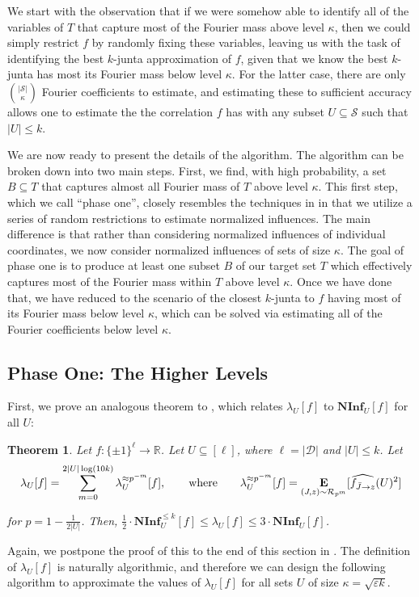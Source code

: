 \documentclass[10pt,a4paper]{article}
\theoremstyle{plain}
\newtheorem{theorem}{Theorem}[section]
\theoremstyle{remark}
\theoremstyle{plain}
\providecommand{\R}{}
\renewcommand{\R}{\mathbb{R}}
\providecommand{\E}{}
\renewcommand{\E}{\mathop{\bf E\/}}
\newcommand\NormInf{{\mathbf{NInf}}}
\newcommand{\eps}{\varepsilon}
\renewcommand{\hat}{\widehat}
\newcommand{\pmone}{\{\pm 1\}}
\newcommand{\calR}{\mathcal{R}}
\newcommand{\calS}{\mathcal{S}}
\newcommand{\InfluentialCoords}{\calS}
\newcommand{\InfluentialOracles}{\mathcal{D}}
\newcommand{\Restrictedf}{f_{\bar{J}\to z}}
\newcommand{\specialset}{T}
\newcommand{\fourierCutoff}{\kappa}
\begin{document}
We start with the observation that if we were somehow able to identify all of the variables of $\specialset$ that capture most of the Fourier mass above level $\fourierCutoff$, then we could simply restrict $f$ by randomly fixing these variables, leaving us with the task of identifying the best $k$-junta approximation of $f$, given that we know the best $k$-junta has most its Fourier mass below level $\fourierCutoff$. For the latter case, there are only $\binom{|\InfluentialCoords|}{\fourierCutoff}$ Fourier coefficients to estimate, and estimating these to sufficient accuracy allows one to estimate the the correlation $f$ has with any subset $U\subseteq \InfluentialCoords$ such that $|U| \leq k$. 


We are now ready to present the details of the algorithm. The algorithm can be  broken down into two main steps. First, we find, with high probability, a set $B \subseteq \specialset$ that captures almost all Fourier mass of $T$ above level $\fourierCutoff$. This first step, which we call ``phase one'', closely resembles the techniques in  in that we utilize a series of random restrictions to estimate normalized influences. The main difference is that rather than considering normalized influences of individual coordinates, we now consider normalized influences of sets of size $\fourierCutoff$. The goal of phase one is to produce at least one subset $B$ of our target set $\specialset$ which effectively captures most of the Fourier mass within $T$ above level $\fourierCutoff$. Once we have done that, we have reduced to the scenario of the closest $k$-junta to $f$ having most of its Fourier mass below level $\fourierCutoff$, which can be solved via estimating all of the Fourier coefficients below level $\fourierCutoff$. 

\subsection{Phase One: The Higher Levels}

First, we prove an analogous theorem to , which relates $\lambda_U[f]$ to $\NormInf_U[f]$ for all $U$:
\begin{theorem}
\label{theorem:ninf-ub-lb-set}
Let $f: \pmone^\ell \to \R$.
Let $U \subseteq [\ell]$, where $\ell = |\InfluentialOracles|$ and $|U| \leq k$.
Let 
$$\lambda_U[f] = \sum_{m=0}^{2|U|\log(10k)} \lambda_U^{\approx p^{-m}}[f],\qquad \text{where}\qquad 
\lambda_U^{\approx p^{-m}}[f] = \E_{(J,z) \sim \calR_{p^{m}}}[\hat{\Restrictedf}(U)^2]$$
%

for $p = 1-\frac{1}{2|U|}$.
Then, $\frac{1}{2}\cdot \NormInf_U^{\leq k}[f] \le \lambda_U[f] \le 3\cdot \NormInf_U[f]$.
\end{theorem}
Again, we postpone the proof of this to the end of this section in .
The definition of $\lambda_U[f]$ is naturally algorithmic, and therefore we can design the following algorithm to approximate the values of $\lambda_U[f]$ for all sets $U$ of size $\fourierCutoff = \sqrt{\eps k}$. 
\end{document}

